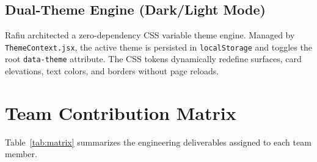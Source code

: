 \documentclass[12pt,a4paper]{report}
\begin{document}
\subsection{Dual-Theme Engine (Dark/Light Mode)}
Rafiu architected a zero-dependency CSS variable theme engine. Managed by \texttt{ThemeContext.jsx}, the active theme is persisted in \texttt{localStorage} and toggles the root \texttt{data-theme} attribute. The CSS tokens dynamically redefine surfaces, card elevations, text colors, and borders without page reloads.

\section{Team Contribution Matrix}
Table~\ref{tab:matrix} summarizes the engineering deliverables assigned to each team member.
\end{document}
